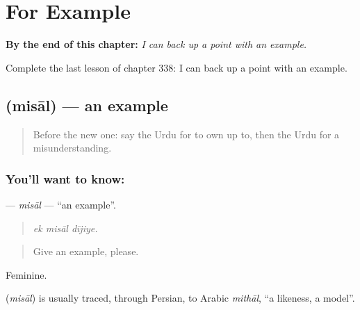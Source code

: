 
\chapter{For Example}
\label{ch:ur-for-example}

\begin{chapteropening}
\textbf{By the end of this chapter:} \emph{I can back up a point with an example.}

Complete the last lesson of chapter 338: I can back up a point with an example.
\end{chapteropening}

\section[\texorpdfstring{\ur{مثال} (misāl)}{مثال (misāl)}]{ (misāl) — an example}

\label{lesson:UR-C338-misal}



\begin{quote}
Before the new one: say the Urdu for to own up to, then the Urdu for a misunderstanding.
\end{quote}

\subsection*{You'll want to know: }
\textbf{} — \emph{misāl} — \textquotedblleft{}an example\textquotedblright{}.

\begin{quote}
  
\end{quote}

\begin{quote}
\emph{ek misāl dījiye.}
\end{quote}

\begin{quote}
Give an example, please.
\end{quote}

Feminine.

\begin{cousinweb}
\textbf{} (\emph{misāl}) is usually traced, through Persian, to Arabic \emph{mithāl}, \textquotedblleft{}a likeness, a model\textquotedblright{}.
\end{cousinweb}

